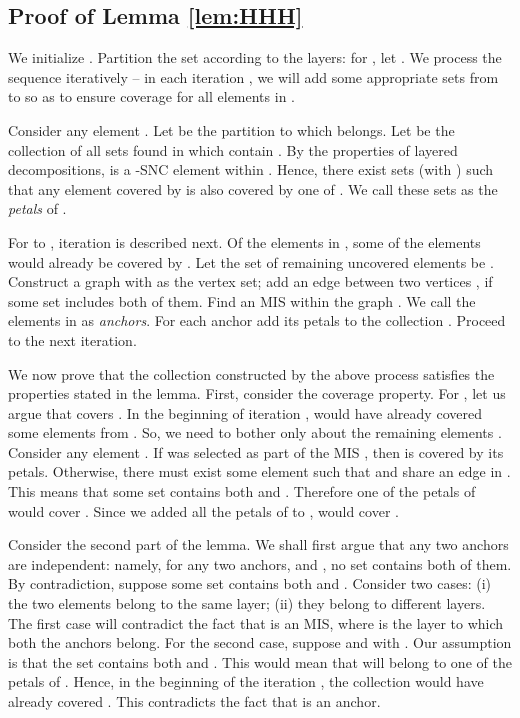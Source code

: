 \documentclass[11pt]{article}
\begin{document}
\subsection{Proof of Lemma \ref{lem:HHH}}
\label{sec:XY-lemma}
We initialize . Partition the set  according to the layers: for , let . 
We process the sequence  iteratively -- in each iteration ,
we will add some appropriate sets from  to  so as to ensure coverage for all elements in .

Consider any element . Let  be the partition to which  belongs.
Let  be the collection of all sets found in  which contain .
By the properties of layered decompositions,  is a -SNC element within .
Hence, there exist sets 
 (with ) such that
any element  covered by 
is also covered by one of .
We call these  sets as the {\em petals} of .

For  to , iteration  is described next.
Of the elements in , some of the elements would already be covered by .
Let the set of remaining uncovered elements be .
Construct a graph  with  as the vertex set; add an edge between two vertices ,
if some set  includes both of them. Find an MIS  within the graph . 
We call the elements in  as {\em anchors}.
For each anchor  add its petals to the collection .
Proceed to the next iteration.

We now prove that the collection  constructed by the above process satisfies the
properties stated in the lemma. First, consider the coverage property.
For , let us argue that  covers .
In the beginning of iteration ,  would have already covered some elements
from . So, we need to bother only about the remaining elements .
Consider any element . If  was selected as part of the MIS ,
then  is covered by its petals. Otherwise, there must exist some element 
such that  and  share an edge in . This means that some set 
contains both  and . Therefore one of the petals of  would cover .
Since we added all the petals of  to ,  would cover .

Consider the second part of the lemma. 
We shall first argue that any two anchors are independent: namely, for any two anchors,
 and , no set  contains both of them.
By contradiction, suppose some set  contains both  and .
Consider two cases: (i) the two elements belong to the same layer;
(ii) they belong to different layers.
The first case will contradict the fact that  is an MIS, where  is the layer to which both the anchors belong.
For the second case, suppose  and  with .
Our assumption is that the set  contains both  and .
This would mean that  will belong to one of the petals of .
Hence, in the beginning of the iteration , the collection  would have already covered .
This contradicts the fact that  is an anchor.
\end{document}
